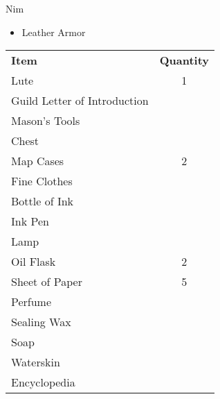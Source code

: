\documentclass[10pt,twoside,twocolumn]{article}
\begin{document}
\begin{charactersheet}{Nim}
        \begin{itemize}
            \item Leather Armor
        \end{itemize}


        \begin{tabular}{lc}
            \textbf{Item} & \textbf{Quantity} \\
            Lute & 1 \\
            Guild Letter of Introduction & \\
            Mason's Tools & \\
            Chest & \\
            Map Cases & 2 \\
            Fine Clothes & \\
            Bottle of Ink & \\
            Ink Pen & \\
            Lamp & \\
            Oil Flask & 2 \\
            Sheet of Paper & 5 \\
            Perfume & \\
            Sealing Wax & \\
            Soap & \\
            Waterskin & \\
            Encyclopedia &
        \end{tabular}

        \charactercoins[silver=9, gold=24]

    \end{charactersheet}

\end{document}
